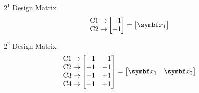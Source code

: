 \begin{Example}{$ 2^1 $ Design Matrix}{}
      \[ \begin{matrix}
                  \text{C1}\rightarrow \\
                  \text{C2}\rightarrow
            \end{matrix}\begin{bmatrix}
                  -1 \\
                  +1
            \end{bmatrix}=\begin{bmatrix}
                  \Vector{x}_1
            \end{bmatrix} \]
\end{Example}
\begin{Example}{$ 2^2 $ Design Matrix}{}
      \[ \begin{matrix}
                  \text{C1}\rightarrow \\
                  \text{C2}\rightarrow \\
                  \text{C3}\rightarrow \\
                  \text{C4}\rightarrow
            \end{matrix}\begin{bmatrix}
                  -1 & -1 \\
                  +1 & -1 \\
                  -1 & +1 \\
                  +1 & +1
            \end{bmatrix}=\begin{bmatrix}
                  \Vector{x}_1 & \Vector{x}_2
            \end{bmatrix} \]
\end{Example}
